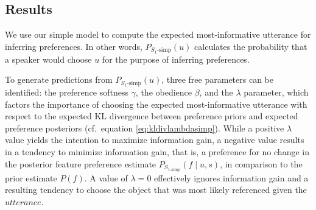\documentclass[11pt,a4paper]{article}
\newcommand{\gcs}[1]{\textcolor{blue}{[gcs: #1]}}
\begin{document}
\subsection{Results}

We use our simple model to compute the expected most-informative utterance for inferring preferences.
In other words, $P_{S_1\textrm{-simp}}(u)$ calculates the probability that a speaker would choose $u$ for the purpose of inferring preferences.

To generate predictions from $P_{S_1\textrm{-simp}}(u)$, three free parameters can be identified:
the preference softness $\gamma$, the obedience $\beta$, and the $\lambda$ parameter, which factors the importance of choosing the expected most-informative utterance with respect to the expected KL divergence between preference priors and expected preference posteriors 
(cf.~equation \ref{eq:kldivlambdasimp}). 
While a positive $\lambda$ value yields the intention to maximize information gain, 
a negative value results in a tendency to minimize information gain, that is, a preference for no change in the posterior feature preference estimate $P_{S_{1\textrm{-simp}}}(f\mid u,s)$, in comparison to the prior estimate $P(f)$. 
A value of $\lambda=0$ effectively ignores information gain and a resulting tendency to choose the object that was most likely referenced given the $utterance$.


\end{document}
